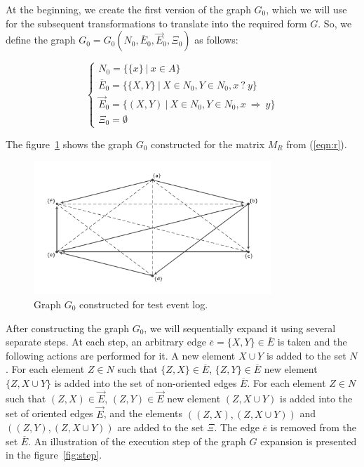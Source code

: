 \documentclass[
11pt,%
tightenlines,%
twoside,%
onecolumn,%
nofloats,%
nobibnotes,%
nofootinbib,%
superscriptaddress,%
noshowpacs,%
centertags]%
{revtex4}
\begin{document}
At the beginning, we create the first version of the graph $G_0$, which we will use for the subsequent transformations to translate into the required form $G$.
So, we define the graph $G_0 = G_0(N_0, \overline{E}_0, \overrightarrow{E}_0, \Xi_0)$ as follows:

\begin{equation}
\begin{cases}
N_0 = \{ \{x\} \ | \ x \in A \} \\
\overline{E}_0 = \{ \{X, Y\} \ | \ X \in N_0, Y \in N_0, x \ ? \ y \} \\
\overrightarrow{E}_0 = \{ (X, Y) \ | \ X \in N_0, Y \in N_0, x \ \Rightarrow \ y \} \\
\Xi_0 = \emptyset
\end{cases}
\end{equation}

The figure~\ref{fig:g_0} shows the graph $G_0$ constructed for the matrix $M_R$ from (\ref{eqn:r}).

\begin{figure}[h]
\includegraphics[width=0.8\textwidth]{pics/g_0.pdf}
\caption{Graph $G_0$ constructed for test event log.}
\label{fig:g_0}
\end{figure}

After constructing the graph $G_0$, we will sequentially expand it using several separate steps.
At each step, an arbitrary edge $\overline{e} = \{X, Y\} \in \overline{E}$ is taken and the following actions are performed for it.
A new element $X \cup Y$ is added to the set $N$.
For each element $Z \in N$ such that $\{Z, X\} \in \overline{E}$, $\{Z, Y\} \in \overline{E}$ new element $\{Z, X \cup Y\}$ is added into the set of non-oriented edges $\overline{E}$.
For each element $Z \in N$ such that $(Z, X) \in \overrightarrow{E}$, $(Z, Y) \in \overrightarrow{E}$ new element $(Z, X \cup Y) $ is added  into the set of oriented edges $\overrightarrow{E}$, and the elements $((Z, X), (Z, X \cup Y))$ and $((Z, Y), (Z, X \cup Y))$ are added to the set $\Xi$.
The edge $\overline{e}$ is removed from the set $\overline{E}$.
An illustration of the execution step of the graph $G$ expansion is presented in the figure~\ref{fig:step}.
\end{document}
